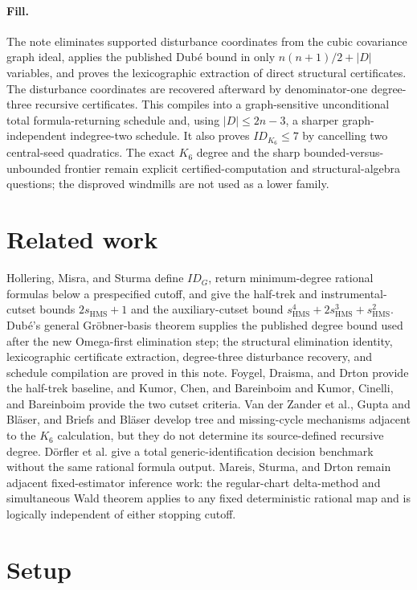 \documentclass{article}
\begin{document}
\paragraph{Fill.} The note eliminates supported disturbance coordinates from the cubic covariance graph ideal, applies the published Dubé bound in only \(n(n+1)/2+|D|\) variables, and proves the lexicographic extraction of direct structural certificates. The disturbance coordinates are recovered afterward by denominator-one degree-three recursive certificates. This compiles into a graph-sensitive unconditional total formula-returning schedule and, using \(|D|\leq2n-3\), a sharper graph-independent indegree-two schedule. It also proves \(ID_{K_6}\leq7\) by cancelling two central-seed quadratics. The exact \(K_6\) degree and the sharp bounded-versus-unbounded frontier remain explicit certified-computation and structural-algebra questions; the disproved windmills are not used as a lower family.

\section{Related work}

Hollering, Misra, and Sturma define \(ID_G\), return minimum-degree rational formulas below a prespecified cutoff, and give the half-trek and instrumental-cutset bounds \(2s_{\mathrm{HMS}}+1\) and the auxiliary-cutset bound \(s_{\mathrm{HMS}}^4+2s_{\mathrm{HMS}}^3+s_{\mathrm{HMS}}^2\). Dubé's general Gröbner-basis theorem supplies the published degree bound used after the new Omega-first elimination step; the structural elimination identity, lexicographic certificate extraction, degree-three disturbance recovery, and schedule compilation are proved in this note. Foygel, Draisma, and Drton provide the half-trek baseline, and Kumor, Chen, and Bareinboim and Kumor, Cinelli, and Bareinboim provide the two cutset criteria. Van der Zander et al., Gupta and Bläser, and Briefs and Bläser develop tree and missing-cycle mechanisms adjacent to the \(K_6\) calculation, but they do not determine its source-defined recursive degree. Dörfler et al. give a total generic-identification decision benchmark without the same rational formula output. Mareis, Sturma, and Drton remain adjacent fixed-estimator inference work: the regular-chart delta-method and simultaneous Wald theorem applies to any fixed deterministic rational map and is logically independent of either stopping cutoff.

\section{Setup}
\end{document}
